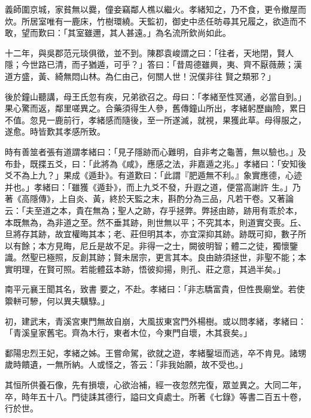 \begin{pinyinscope}
 義師圍京城，家貧無以爨，僮妾竊鄰人樵以繼火。孝緒知之，乃不食，更令撤屋而炊。所居室唯有一鹿床，竹樹環繞。天監初，御史中丞任昉尋其兄履之，欲造而不敢，望而歎曰：「其室雖邇，其人甚遠。」為名流所欽尚如此。



 十二年，與吳郡范元琰俱徵，並不到。陳郡袁峻謂之曰：「往者，天地閉，賢人隱；今世路已清，而子猶遁，可乎？」答曰：「昔周德雖興，夷、齊不厭薇蕨；漢道方盛，黃、綺無悶山林。為仁由己，何關人世！況僕非往
 賢之類邪？」



 後於鐘山聽講，母王氏忽有疾，兄弟欲召之。母曰：「孝緒至性冥通，必當自到。」果心驚而返，鄰里嗟異之。合藥須得生人參，舊傳鐘山所出，孝緒躬歷幽險，累日不值。忽見一鹿前行，孝緒感而隨後，至一所遂滅，就視，果獲此草。母得服之，遂愈。時皆歎其孝感所致。



 時有善筮者張有道謂孝緒曰：「見子隱跡而心難明，自非考之龜蓍，無以驗也。」及布卦，既揲五爻，曰：「此將為《咸》，應感之法，非嘉遁之兆。」孝緒曰：「安知後爻不為上九？」果成《遁卦》。有道歎曰：「此謂『肥遁無不利。』象實應德，心迹并也。」孝緒曰：「雖獲《遁卦》，而上九爻不發，升遐之道，便當高謝許
 生。」乃著《高隱傳》，上自炎、黃，終於天監之末，斟酌分為三品，凡若干卷。又著論云：「夫至道之本，貴在無為；聖人之跡，存乎拯弊。弊拯由跡，跡用有乖於本，本既無為，為非道之至。然不垂其跡，則世無以平；不究其本，則道實交喪。丘、旦將存其跡，故宜權晦其本；老、莊但明其本，亦宜深抑其跡。跡既可抑，數子所以有餘；本方見晦，尼丘是故不足。非得一之士，闕彼明智；體二之徒，獨懷鑒識。然聖已極照，反創其跡；賢未居宗，更言其本。良由跡須拯世，非聖不能；本實明理，在賢可照。若能體茲本跡，悟彼抑揚，則孔、莊之意，其過半矣。」



 南平元襄王聞其名，致書
 要之，不赴。孝緒曰：「非志驕富貴，但性畏廟堂。若使籞軿可驂，何以異夫驥騄。」



 初，建武末，青溪宮東門無故自崩，大風拔東宮門外楊樹。或以問孝緒，孝緒曰：「青溪皇家舊宅。齊為木行，東者木位，今東門自壞，木其衰矣。」



 鄱陽忠烈王妃，孝緒之姊。王嘗命駕，欲就之遊，孝緒鑿垣而逃，卒不肯見。諸甥歲時饋遺，一無所納。人或怪之，答云：「非我始願，故不受也。」



 其恒所供養石像，先有損壞，心欲治補，經一夜忽然完復，眾並異之。大同二年，卒，時年五十八。門徒誄其德行，謚曰文貞處士。所著《七錄》等書二百五十卷，行於世。




\end{pinyinscope}
